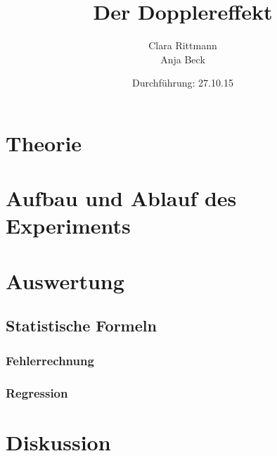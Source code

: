 \documentclass[a4,12pt]{article}
\title{Der Dopplereffekt}
\author{Clara Rittmann \\ Anja Beck}
\date{Durchführung: 27.10.15}
\begin{document}
	\maketitle
	\date{}
	\tableofcontents

	\section{Theorie}
	

	\section{Aufbau und Ablauf des Experiments}
	



	\section{Auswertung}
	\subsection{Statistische Formeln}
	\subsubsection{Fehlerrechnung}
	
	\subsubsection{Regression}
	

	

	\section{Diskussion}
	
\end{document}
